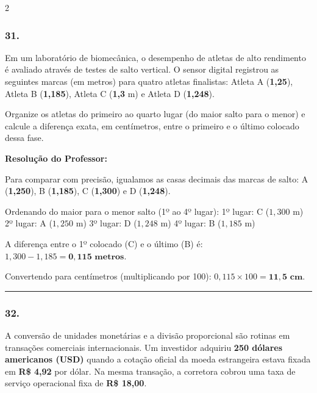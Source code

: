 \begin{multicols*}{2}
\subsubsection*{31.} Em um laboratório de biomecânica, o desempenho de atletas de alto rendimento é avaliado através de testes de salto vertical. O sensor digital registrou as seguintes marcas (em metros) para quatro atletas finalistas: Atleta A (\textbf{1,25}), Atleta B (\textbf{1,185}), Atleta C (\textbf{1,3} m) e Atleta D (\textbf{1,248}).

Organize os atletas do primeiro ao quarto lugar (do maior salto para o menor) e calcule a diferença exata, em centímetros, entre o primeiro e o último colocado dessa fase.

\ifgabarito
    \begin{tcolorbox}[colback=CorTitUm!5, colframe=CorTitUm, boxrule=1pt, arc=4pt, left=6pt, right=6pt, top=6pt, bottom=6pt]
    \small\textbf{\textcolor{CorTitUm}{Resolução do Professor:}}\par\vspace{0.1cm}
    \color{CinzaEscuro}
    Para comparar com precisão, igualamos as casas decimais das marcas de salto: A (\textbf{1,250}), B (\textbf{1,185}), C (\textbf{1,300}) e D (\textbf{1,248}).
    
    Ordenando do maior para o menor salto (1º ao 4º lugar):
    1º lugar: C ($1,300\text{ m}$)
    2º lugar: A ($1,250\text{ m}$)
    3º lugar: D ($1,248\text{ m}$)
    4º lugar: B ($1,185\text{ m}$)
    
    A diferença entre o 1º colocado (C) e o último (B) é:
    $1,300 - 1,185 = \mathbf{0,115\text{ metros}}$.
    
    Convertendo para centímetros (multiplicando por 100): $0,115 \times 100 = \mathbf{11,5\text{ cm}}$.
    \end{tcolorbox}
\fi

\par\vspace{\espacoQuestao}

\noindent\textcolor{CorLinha}{\rule{\linewidth}{0.5pt}} 
\par\vspace{\espacoPreQuestao}
\subsubsection*{32.} A conversão de unidades monetárias e a divisão proporcional são rotinas em transações comerciais internacionais. Um investidor adquiriu \textbf{250 dólares americanos (USD)} quando a cotação oficial da moeda estrangeira estava fixada em \textbf{R\$ 4,92} por dólar. Na mesma transação, a corretora cobrou uma taxa de serviço operacional fixa de \textbf{R\$ 18,00}.


\end{multicols*}
